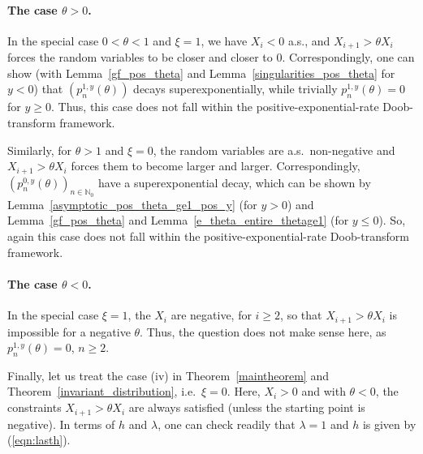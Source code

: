 \documentclass[12pt]{article}
\newcommand{\N}{\mathbb{N}} %
\newcommand{\1}{\mathds{1}}
\theoremstyle{definition}
\theoremstyle{plain}
\theoremstyle{remark}
\begin{document}
\paragraph{The case \texorpdfstring{$\theta>0$}{theta >0}.}
 In the special case $0<\theta<1$ and $\xi=1$, we have $X_i<0$ a.s., and $X_{i+1} >\theta X_i$ forces the random variables to be closer and closer to $0$. Correspondingly, one can show (with Lemma~\ref{gf_pos_theta} and Lemma~\ref{singularities_pos_theta} for $y<0$) that $(p_n^{1,y}(\theta))$ decays superexponentially, while trivially $p_n^{1,y}(\theta)=0$ for $y\geq 0$. Thus, this case does not fall within the positive-exponential-rate Doob-transform framework.

Similarly, for $\theta>1$ and $\xi=0$, the random variables are a.s.\ non-negative and $X_{i+1}> \theta X_i$ forces them to become larger and larger. Correspondingly, $\left(p_n^{0,y}(\theta)\right)_{n\in\N_0}$ have a superexponential decay, which can be shown by Lemma~\ref{asymptotic_pos_theta_ge1_pos_y} (for $y>0$) and Lemma~\ref{gf_pos_theta} and Lemma~\ref{e_theta_entire_thetage1} (for $y\leq 0$). So, again this case does not fall within the positive-exponential-rate Doob-transform framework. 

\paragraph{The case \texorpdfstring{$\theta<0$}{theta <0}.}
In the special case $\xi=1$, the $X_i$ are negative, for $i\geq 2$, so that $X_{i+1}>\theta X_i$ is impossible for a negative $\theta$. Thus, the question does not make sense here, as $p_n^{1,y}(\theta)=0$, $n\geq 2$.

Finally, let us treat the case (iv) in Theorem~\ref{maintheorem} and Theorem~\ref{invariant_distribution}, i.e.\ $\xi=0$. Here, $X_i>0$ and with $\theta<0$, the constraints $X_{i+1}>\theta X_i$ are always satisfied (unless the starting point is negative). 
In terms of $h$ and $\lambda$, one can check readily that $\lambda=1$ and $h$ is given by (\ref{eqn:lasth}).
\end{document}

